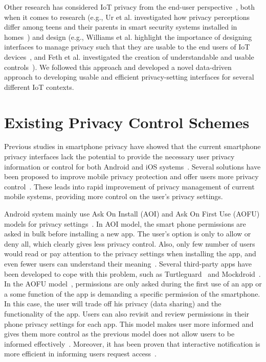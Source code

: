 Other research has considered IoT privacy from the end-user perspective~\cite{feth_user-centered_2017}, both when it comes to research (e.g., Ur et al. investigated how privacy perceptions differ among teens and their parents in smart security systems installed in homes~\cite{ur_intruders_2014}) and design (e.g., Williams et al. highlight the importance of designing interfaces to manage privacy such that they are usable to the end users of IoT devices~\cite{williams2016perfect}, and Feth et al. investigated the creation of understandable and usable controls~\cite{feth_user-centered_2017}). We followed this approach and developed a novel data-driven approach to developing usable and efficient privacy-setting interfaces for several different IoT contexts.

\section{Existing Privacy Control Schemes}
Previous studies in smartphone privacy have showed that the current smartphone privacy interfaces lack the potential to provide the necessary user privacy information or control for both Android and iOS systems~\cite{lin2014modeling}. Several solutions have been proposed to improve mobile privacy protection and offer users more privacy control~\cite{felt2012android, beresford2011mockdroid}. These leads into rapid improvement of privacy management of current mobile systems, providing more control on the user's privacy settings.

Android system mainly use Ask On Install (AOI) and Ask On First Use (AOFU) models for privacy settings~\cite{tsai2017turtle, wijesekera2017feasibility}. In AOI model, the smart phone permissions are asked in bulk before installing a new app. The user's option is only to allow or deny all, which clearly gives less privacy control. Also, only few number of users would read or pay attention to the privacy settings when installing the app, and even fewer users can understand their meaning~\cite{felt2012android,kelley2012conundrum}. Several third-party apps have been developed to cope with this problem, such as Turtleguard~\cite{tsai2017turtle} and Mockdroid~\cite{beresford2011mockdroid}. %
In the AOFU model~\cite{tsai2017turtle}, permissions are only asked during the first use of an app or a some function of the app is demanding a specific permission of the smartphone. In this case, the user will trade off his privacy (data sharing) and the functionality of the app. Users can also revisit and review permissions in their phone privacy settings for each app. This model makes user more informed and gives them more control as the previous model does not allow users to be informed effectively~\cite{fu2014field}. Moreover, it has been proven that interactive notification is more efficient in informing users request access~\cite{fu2014field}.

